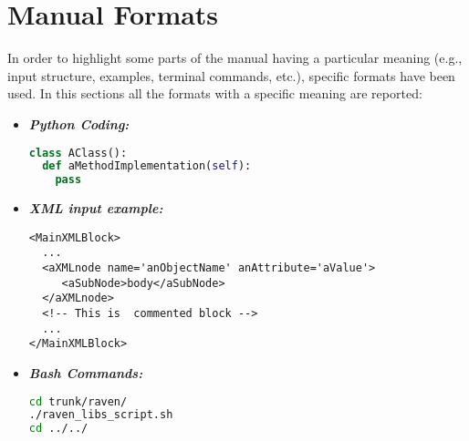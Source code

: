\section{Manual Formats}
In order to highlight some parts of the manual having a particular meaning (e.g., input structure, examples, terminal commands, etc.), specific formats have been used. In this sections all the formats with a specific meaning are reported:
\begin{itemize}
\item \textbf{\textit{Python Coding:}}
\begin{lstlisting}[language=python]
class AClass():
  def aMethodImplementation(self):
    pass
\end{lstlisting}
\item \textbf{\textit{XML input example:}}
\begin{lstlisting}[style=XML,morekeywords={anAttribute}]
<MainXMLBlock>
  ...
  <aXMLnode name='anObjectName' anAttribute='aValue'>
     <aSubNode>body</aSubNode>
  </aXMLnode>
  <!-- This is  commented block -->
  ...
</MainXMLBlock>
\end{lstlisting}
\item \textbf{\textit{Bash Commands:}}
\begin{lstlisting}[language=bash]
cd trunk/raven/
./raven_libs_script.sh
cd ../../
\end{lstlisting}
\end{itemize}
 

